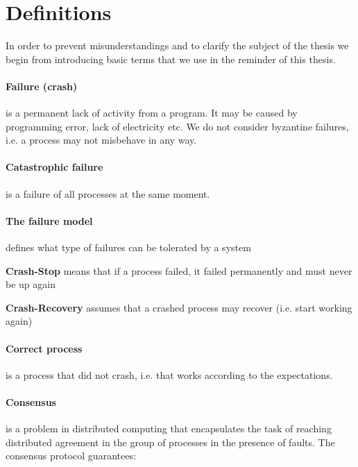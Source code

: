 \clearpage

\section{Definitions}

In order to prevent misunderstandings and to clarify the subject of the thesis we begin from introducing
basic %
terms that we use in the reminder of this thesis.

\paragraph{Failure (crash)}
is a permanent lack of activity from a program. It may be caused by programming error, lack of electricity etc.
We do not consider byzantine failures, i.e. a process may not misbehave in any way.

\paragraph{Catastrophic failure} is a failure of all processes at the same moment.

\paragraph{The failure model}
defines what type of failures can be tolerated by a system
\begin{tightList}[ \setlength{\leftmargin}{2\leftmargin}]
 \item[\textbf{Crash-Stop}] means that if a process failed, it failed permanently and must never be up again
 \item[\textbf{Crash-Recovery}] assumes that a crashed process may recover (i.e. start working again)
\end{tightList}

\paragraph{Correct process} is a process that did not crash, i.e. that works according to the expectations.

\paragraph{Consensus}
is a problem in distributed computing that encapsulates the task of reaching distributed agreement in the group of processes in the presence of faults.
The consensus protocol guarantees:

